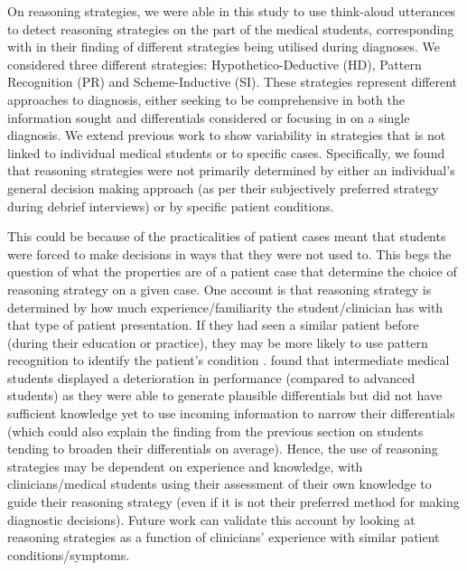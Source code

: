 \documentclass[a4paper, nobind]{templates/ociamthesis}
\begin{document}
On reasoning strategies, we were able in this study to use think-aloud utterances to detect reasoning strategies on the part of the medical students, corresponding with \textcite{coderre_diagnostic_2003} in their finding of different strategies being utilised during diagnoses. We considered three different strategies: Hypothetico-Deductive (HD), Pattern Recognition (PR) and Scheme-Inductive (SI). These strategies represent different approaches to diagnosis, either seeking to be comprehensive in both the information sought and differentials considered or focusing in on a single diagnosis. We extend previous work to show variability in strategies that is not linked to individual medical students or to specific cases. Specifically, we found that reasoning strategies were not primarily determined by either an individual's general decision making approach (as per their subjectively preferred strategy during debrief interviews) or by specific patient conditions.

This could be because of the practicalities of patient cases meant that students were forced to make decisions in ways that they were not used to. This begs the question of what the properties are of a patient case that determine the choice of reasoning strategy on a given case. One account is that reasoning strategy is determined by how much experience/familiarity the student/clinician has with that type of patient presentation. If they had seen a similar patient before (during their education or practice), they may be more likely to use pattern recognition to identify the patient's condition \autocite{nendaz_diagnostic_2012}. \textcite{arocha_novice_1995} found that intermediate medical students displayed a deterioration in performance (compared to advanced students) as they were able to generate plausible differentials but did not have sufficient knowledge yet to use incoming information to narrow their differentials (which could also explain the finding from the previous section on students tending to broaden their differentials on average). Hence, the use of reasoning strategies may be dependent on experience and knowledge, with clinicians/medical students using their assessment of their own knowledge to guide their reasoning strategy (even if it is not their preferred method for making diagnostic decisions). Future work can validate this account by looking at reasoning strategies as a function of clinicians' experience with similar patient conditions/symptoms.
\end{document}

